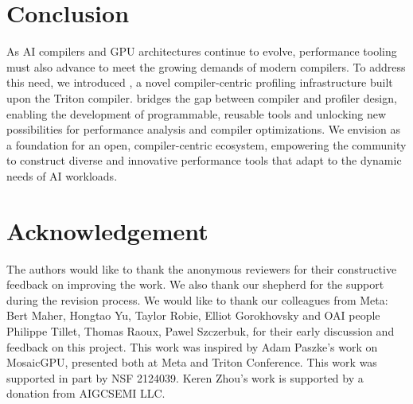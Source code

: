 \section{Conclusion}

As AI compilers and GPU architectures continue to evolve, performance tooling must also advance to meet the growing demands of modern compilers. 
To address this need, we introduced \thiswork{}, a novel compiler-centric profiling infrastructure built upon the Triton compiler. 
\thiswork{} bridges the gap between compiler and profiler design, enabling the development of programmable, reusable tools and unlocking new possibilities for performance analysis and compiler optimizations. 
We envision \thiswork{} as a foundation for an open, compiler-centric ecosystem, empowering the community to construct diverse and innovative performance tools that adapt to the dynamic needs of AI workloads.

\section*{Acknowledgement}

The authors would like to thank the anonymous reviewers for their constructive feedback on improving the work.
We also thank our shepherd for the support during the revision process.
We would like to thank our colleagues from Meta: Bert Maher, Hongtao Yu, Taylor Robie, Elliot Gorokhovsky and OAI people Philippe Tillet, Thomas Raoux, Pawel Szczerbuk, for their early discussion and feedback on this project.
This work was inspired by Adam Paszke's work on MosaicGPU, presented both at Meta and Triton Conference.
This work was supported in part by NSF 2124039.
Keren Zhou's work is supported by a donation from AIGCSEMI LLC.

